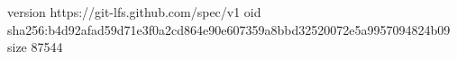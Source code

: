 version https://git-lfs.github.com/spec/v1
oid sha256:b4d92afad59d71e3f0a2cd864e90e607359a8bbd32520072e5a9957094824b09
size 87544
